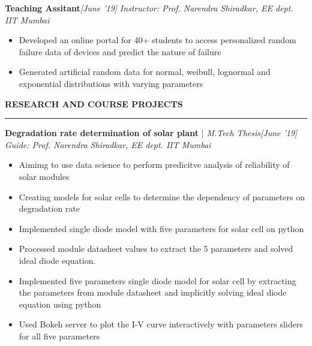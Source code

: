 \documentclass[10 pt]{article}%
\begin{document}
{{{\flushleft \bf {\large{Teaching Assitant}}}\hfill {{{\em{[June '19]}}}}
\vspace{-0.8em}
{\flushleft \em{Instructor: Prof. Narendra Shiradkar, EE dept. IIT Mumbai}}
\vspace{-5pt}
\begin{itemize}[leftmargin=*]
	\setlength\itemsep{1.5pt}
	\setlength\parskip{1.5pt}
	\item Developed an online portal for 40+ students to access personalized random failure data of devices and predict the nature of failure
	\item Generated artificial random data for normal, weibull, lognormal and exponential distributions with varying parameters
\end{itemize}
\begin{flushleft}\bf{\Large{\textcolor{color2}{RESEARCH AND COURSE PROJECTS}}}\end{flushleft}
\vspace{-5pt}
\hrule
\vspace{1 pt}
{\flushleft \textbf {\large{Degradation rate determination of solar plant}} |\em{ M.Tech Thesis}}\hfill {{{\em{[June '19]}}}}
\vspace{-0.8em}
{\flushleft \em{Guide: Prof. Narendra Shiradkar, EE dept. IIT Mumbai}}
\vspace{-5pt}
\begin{itemize}[leftmargin=*]
	\setlength\itemsep{1.5pt}
	\setlength\parskip{1.5pt}
	\item Aimimg to use data science to perform predicitve analysis of reliability of solar modules
	\item Creating models for solar cells to determine the dependency of parameters on degradation rate
	\item Implemented single diode model with five parameters for solar cell on python 
	\item Processed module datasheet values to extract the 5 parameters and solved ideal diode equation.
	\item Implemented five parameters single diode model for solar cell by extracting the parameters from module datasheet and implicitly solving ideal diode equation using python
	\item Used Bokeh server to plot the I-V curve interactively with parameters sliders for all five parameters

\end{itemize}}}
\end{document}

